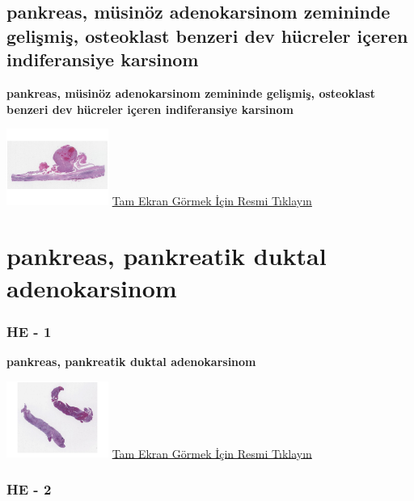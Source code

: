 \documentclass[
  letterpaper,
  DIV=11,
  numbers=noendperiod]{scrreprt}
\begin{document}
\hypertarget{sec-pankreas-musinous-adenokarsinom-osteoklast}{%
\section{pankreas, müsinöz adenokarsinom zemininde gelişmiş, osteoklast
benzeri dev hücreler içeren indiferansiye
karsinom}\label{sec-pankreas-musinous-adenokarsinom-osteoklast}}

\textbf{pankreas, müsinöz adenokarsinom zemininde gelişmiş, osteoklast
benzeri dev hücreler içeren indiferansiye karsinom}

\href{https://images.patolojiatlasi.com/pancreas-undifferentiated-osteoclast/HE.html}{\includegraphics[width=0.25\textwidth,height=\textheight]{./screenshots/pancreas-undifferentiated-osteoclast_screenshot.png}}
\href{https://images.patolojiatlasi.com/pancreas-undifferentiated-osteoclast/HE.html}{Tam
Ekran Görmek İçin Resmi Tıklayın}

\hypertarget{sec-PDAC-tru-cut}{%
\chapter{pankreas, pankreatik duktal
adenokarsinom}\label{sec-PDAC-tru-cut}}

\hypertarget{he---1-2}{%
\subsection{HE - 1}\label{he---1-2}}

\textbf{pankreas, pankreatik duktal adenokarsinom}

\href{https://images.patolojiatlasi.com/PDAC-tru-cut/HE1.html}{\includegraphics[width=0.25\textwidth,height=\textheight]{./screenshots/PDAC-tru-cut-1_screenshot.png}}
\href{https://images.patolojiatlasi.com/PDAC-tru-cut/HE1.html}{Tam Ekran
Görmek İçin Resmi Tıklayın}

\hypertarget{he---2-2}{%
\subsection{HE - 2}\label{he---2-2}}
\end{document}
